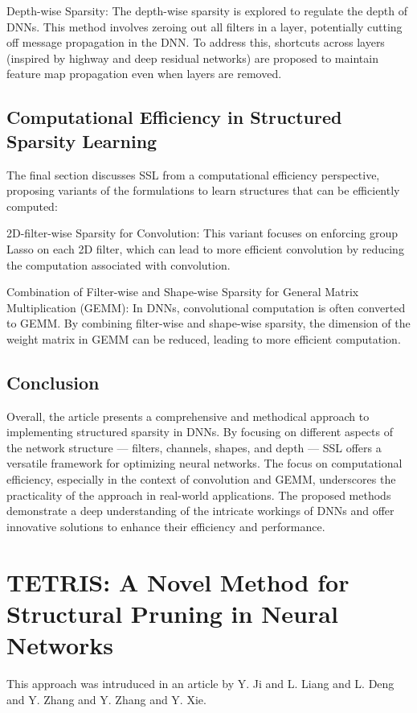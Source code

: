 Depth-wise Sparsity: The depth-wise sparsity is explored to regulate the depth of DNNs. This method involves zeroing out all filters in a layer, potentially cutting off message propagation in the DNN. To address this, shortcuts across layers (inspired by highway and deep residual networks) are proposed to maintain feature map propagation even when layers are removed.

\subsection{Computational Efficiency in Structured Sparsity Learning}

The final section discusses SSL from a computational efficiency perspective, proposing variants of the formulations to learn structures that can be efficiently computed:

2D-filter-wise Sparsity for Convolution: This variant focuses on enforcing group Lasso on each 2D filter, which can lead to more efficient convolution by reducing the computation associated with convolution.

Combination of Filter-wise and Shape-wise Sparsity for General Matrix Multiplication (GEMM): In DNNs, convolutional computation is often converted to GEMM. By combining filter-wise and shape-wise sparsity, the dimension of the weight matrix in GEMM can be reduced, leading to more efficient computation.

\subsection{Conclusion}

Overall, the article presents a comprehensive and methodical approach to implementing structured sparsity in DNNs. By focusing on different aspects of the network structure — filters, channels, shapes, and depth — SSL offers a versatile framework for optimizing neural networks. The focus on computational efficiency, especially in the context of convolution and GEMM, underscores the practicality of the approach in real-world applications. The proposed methods demonstrate a deep understanding of the intricate workings of DNNs and offer innovative solutions to enhance their efficiency and performance.

\section{TETRIS: A Novel Method for Structural Pruning in Neural Networks}
This approach was intruduced in an article \cite{tetris} by Y. Ji and L. Liang and L. Deng and Y. Zhang and Y. Zhang and Y. Xie.

